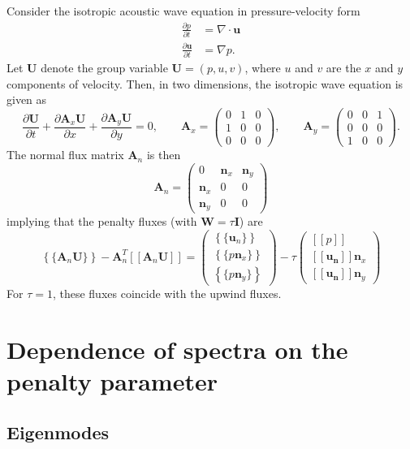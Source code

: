 \documentclass[10pt]{article}
\newcommand{\pd}[2]{\frac{\partial#1}{\partial#2}}
\newcommand{\LRs}[1]{\left[ #1 \right]}
\newcommand{\LRc}[1]{\left\{ #1 \right\}}
\newcommand{\Grad} {\ensuremath{\nabla}}
\newcommand{\Div} {\ensuremath{\nabla\cdot}}
\newcommand{\jump}[1] {\ensuremath{\LRs{\![#1]\!}}}
\newcommand{\avg}[1] {\ensuremath{\LRc{\!\{#1\}\!}}}
\begin{document}
Consider the isotropic acoustic wave equation in pressure-velocity form
\begin{align*}
\pd{p}{t} &= \Div \bm{u}\\
\pd{\bm{u}}{t} &= \Grad p.
\end{align*}
Let $\bm{U}$ denote the group variable $\bm{U} = (p,u,v)$, where $u$ and $v$ are the $x$ and $y$ components of velocity.  Then, in two dimensions, the isotropic wave equation is given as
\[
\pd{\bm{U}}{t} + \pd{\bm{A}_x\bm{U}}{x} + \pd{\bm{A}_y\bm{U}}{y} = 0, \qquad \bm{A}_x = 
\left(\begin{array}{ccc}
0 & 1 & 0\\
1 & 0 & 0\\
0 & 0 & 0
\end{array}
\right), \qquad 
\bm{A}_y = 
\left(\begin{array}{ccc}
0 & 0 & 1\\
0 & 0 & 0\\
1 & 0 & 0
\end{array}
\right).
\]
The normal flux matrix $\bm{A}_n$ is then
\[
\bm{A}_n = 
\left(\begin{array}{ccc}
0 & \bm{n}_x & \bm{n}_y\\
\bm{n}_x & 0 & 0\\
\bm{n}_y & 0 & 0
\end{array}
\right)
\]
implying that the penalty fluxes (with $\bm{W} = \tau\bm{I}$) are 
\[
\avg{\bm{A}_n \bm{U}} - \bm{A}_n^T \jump{\bm{A}_n\bm{U}} = \left(\begin{array}{c}
\avg{\bm{u}_n}\\
\avg{p \bm{n}_x}\\
\avg{p \bm{n}_y}
\end{array}
\right) - 
\tau\left(\begin{array}{c}
\jump{p}\\
\jump{\bm{u_n}}\bm{n}_x\\
\jump{\bm{u_n}}\bm{n}_y
\end{array}
\right)
\]
For $\tau = 1$, these fluxes coincide with the upwind fluxes.  

\section{Dependence of spectra on the penalty parameter}


\subsection{Eigenmodes}
\end{document}
